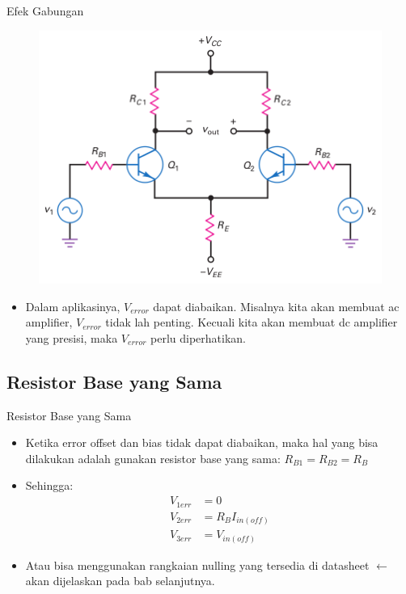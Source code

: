 \documentclass[aspectratio=169]{beamer}
\begin{document}
\begin{frame}{Efek Gabungan}
	\begin{multicols}{2}
		\begin{figure}
			\centering
			\includegraphics[height=0.6\textheight]{gambar/01.output_of_diff_amp_includes_desired_signal_and_error_voltage}
		\end{figure}
		\columnbreak
		\begin{itemize}
			\item Dalam aplikasinya, $ V_{error} $ dapat diabaikan. Misalnya kita akan membuat ac amplifier, $ V_{error} $ tidak lah penting. Kecuali kita akan membuat dc amplifier yang presisi, maka $ V_{error} $ perlu diperhatikan.
		\end{itemize}
	\end{multicols}
\end{frame}

\subsection{Resistor Base yang Sama}
\begin{frame}{Resistor Base yang Sama}
	\begin{itemize}
		\item Ketika error offset dan bias tidak dapat diabaikan, maka hal yang bisa dilakukan adalah gunakan resistor base yang sama: $ R_{B1} = R_{B2} = R_{B}$
		\item Sehingga:
		\begin{align*}
			V_{1err} &= 0 \\
			V_{2err} &= R_B I_{in(off)} \\
			V_{3err} &= V_{in(off)}
		\end{align*}
		\item Atau bisa menggunakan rangkaian nulling yang tersedia di datasheet $ \leftarrow $ akan dijelaskan pada bab selanjutnya.
	\end{itemize}
\end{frame}
\end{document}
